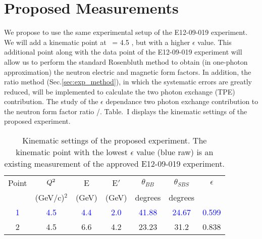 \section{Proposed Measurements} 
\label{prop}

We propose to use the same experimental setup of the E12-09-019 experiment. We will add a kinematic point at \qsq~= 4.5 \gevcsq, but with a higher $\epsilon$ value. This additional point along with the data point of the E12-09-019 experiment will allow us to perform the standard Rosenbluth method to obtain (in one-photon approximation) the neutron electric and magnetic form factors. In addition, the ratio method (Sec.\ref{sec:exp_method}), in which the systematic errors are greatly reduced, will be implemented to calculate  the two photon exchange (TPE) contribution. The study of the $\epsilon$ dependance two photon exchange contribution to the neutron form factor ratio \gen/\gmn. Table.~I displays the kinematic settings of the proposed experiment. 

\begin{table}[h] 
\centering
\begin{tabular}{|c|c|c|c|c|c|c|}
\hline
\small{Point} & $Q\textsuperscript{2}$  & E & E$'$  & $\theta_{BB}$ & $\theta_{SBS}$ & $\epsilon$ \\
& (GeV/c)$^2$ & (GeV) & (GeV)  &\; degrees\; & \; degrees \;  &   \\
\hline
\textcolor{blue}
 1&\textcolor{blue} {4.5} & \textcolor{blue}{4.4} & \textcolor{blue}{2.0} & \textcolor{blue}{41.88}  & \textcolor{blue}{24.67} &\; \textcolor{blue}{0.599} \;\\
\hline
2 & 4.5  &  6.6  &  4.2  & 23.23  &  31.2  &  0.838 \\
\hline
\end{tabular} 
\caption{Kinematic settings of the proposed experiment. The kinematic point with the lowest $\epsilon$ value (blue raw) is an existing measurement of the approved  E12-09-019 experiment.}
\label{tab:propkin}
\end{table}

